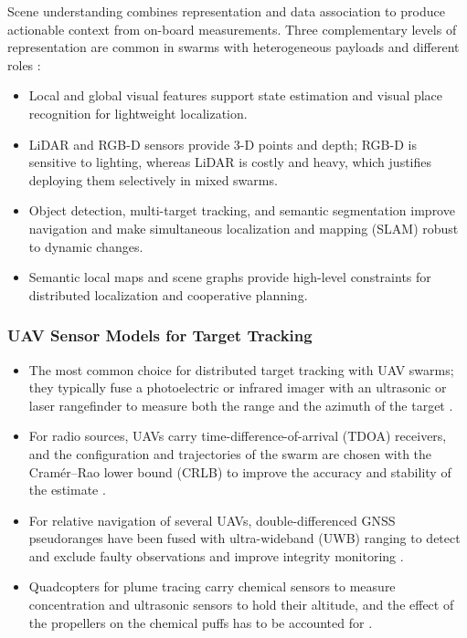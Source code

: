 Scene understanding combines representation and data association to produce
actionable context from on-board measurements. Three complementary levels of
representation are common in swarms with heterogeneous payloads and different
roles \cite{chen2025survey}:
\begin{itemize}
  \item {} Local and global visual features support state
        estimation and visual place recognition for lightweight localization.
  \item {} LiDAR and RGB-D sensors provide 3-D points and
        depth; RGB-D is sensitive to lighting, whereas LiDAR is costly and heavy,
        which justifies deploying them selectively in mixed swarms.
  \item {} Object detection, multi-target tracking, and
        semantic segmentation improve navigation and make simultaneous
        localization and mapping (SLAM) robust to dynamic changes.
  \item {} Semantic local maps and scene graphs provide
        high-level constraints for distributed localization and cooperative
        planning.
\end{itemize}

\subsubsection{UAV Sensor Models for Target Tracking}

\begin{itemize}
  \item {} The most common choice for distributed
        target tracking with UAV swarms; they typically fuse a photoelectric or
        infrared imager with an ultrasonic or laser rangefinder to measure both
        the range and the azimuth of the target \cite{lizzio2022review}.
  \item {} For radio sources, UAVs carry
        time-difference-of-arrival (TDOA) receivers, and the configuration and
        trajectories of the swarm are chosen with the Cram\'er--Rao lower bound
        (CRLB) to improve the accuracy and stability of the estimate
        \cite{wang2018optimal}.
  \item {} For relative navigation of several UAVs,
        double-differenced GNSS pseudoranges have been fused with ultra-wideband
        (UWB) ranging to detect and exclude faulty observations and improve
        integrity monitoring \cite{sun2021autonomous}.
  \item {} Quadcopters for plume tracing carry chemical
        sensors to measure concentration and ultrasonic sensors to hold their
        altitude, and the effect of the propellers on the chemical puffs has to
        be accounted for \cite{tan2016handbook}.
\end{itemize}


